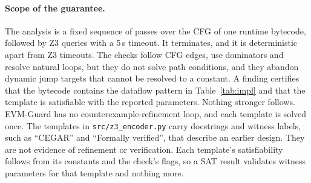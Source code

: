 \documentclass[pdflatex,sn-mathphys]{sn-jnl}
\theoremstyle{thmstyleone}
\theoremstyle{thmstyletwo}
\begin{document}
\paragraph{Scope of the guarantee.} The analysis is a fixed sequence of passes over the CFG of one runtime bytecode, followed by Z3 queries with a 5\,s timeout. It terminates, and it is deterministic apart from Z3 timeouts. The checks follow CFG edges, use dominators and resolve natural loops, but they do not solve path conditions, and they abandon dynamic jump targets that cannot be resolved to a constant. A finding certifies that the bytecode contains the dataflow pattern in Table~\ref{tab:impl} and that the template is satisfiable with the reported parameters. Nothing stronger follows. EVM-Guard has no counterexample-refinement loop, and each template is solved once. The templates in \texttt{src/z3\_encoder.py} carry docstrings and witness labels, such as ``CEGAR'' and ``Formally verified'', that describe an earlier design. They are not evidence of refinement or verification. Each template's satisfiability follows from its constants and the check's flags, so a SAT result validates witness parameters for that template and nothing more.
\end{document}
